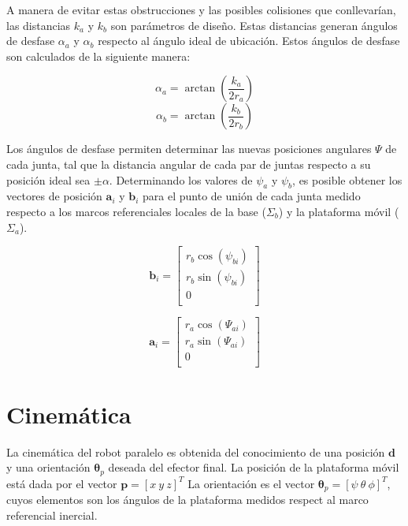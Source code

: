 A manera de evitar estas obstrucciones y las posibles 
colisiones que conllevarían, 
las distancias $k_a$ y $k_b$ son parámetros de diseño.
Estas distancias generan ángulos de desfase 
$\alpha_a$ y $\alpha_b$ respecto al ángulo ideal de ubicación.
Estos ángulos de desfase son calculados de la siguiente manera:

\begin{equation} \label{eq: azi-a}
\alpha_a = \arctan\left(\frac{k_a}{2r_a}\right)
\end{equation}
\begin{equation} \label{eq: azi-b}
\alpha_b = \arctan\left(\frac{k_b}{2r_b}\right)
\end{equation}

Los ángulos de desfase permiten determinar las nuevas posiciones angulares 
$\Psi$ de cada junta, tal que la distancia angular de cada par de juntas 
respecto a su posición ideal sea $\pm \alpha$. 
Determinando los valores de $\psi_a$ y $\psi_b$, es posible
obtener los vectores de posición $\mathbf a_i$ y $\mathbf b_i$ 
para el punto de unión de cada junta
medido respecto a los marcos referenciales locales de 
la base ($\Sigma_b$) y la plataforma móvil ($\Sigma_a$).


\begin{equation} \label{eq: p_b}
\mathbf b_i = \begin{bmatrix}
r_b\cos(\psi_{bi})\\
r_b\sin(\psi_{bi})\\
0\\
\end{bmatrix}
\end{equation}

\begin{equation} \label{eq: p_a}
\mathbf a_i = \begin{bmatrix}
r_a\cos(\Psi_{ai})\\
r_a\sin(\Psi_{ai})\\
0\\
\end{bmatrix}
\end{equation}

\section{Cinemática}

La cinemática del robot paralelo es obtenida del conocimiento de una posición $\mathbf d$
y una orientación $\mathbf \theta_p$ deseada del efector final.
La posición de la plataforma móvil está dada por el vector $\mathbf p = [x \ y \ z]^T$
La orientación es el vector $\boldsymbol \theta_p = [\psi \ \theta \ \phi]^T$, 
cuyos elementos son los ángulos de la plataforma medidos respect al marco referencial inercial.

